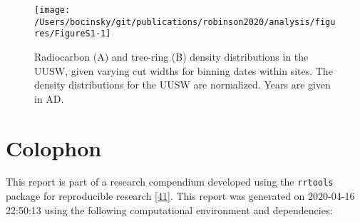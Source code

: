 \documentclass[
]{sa}
\begin{document}
\begin{figure}

{\centering \texttt{[image: /Users/bocinsky/git/publications/robinson2020/analysis/figures/FigureS1-1]} 

}

\caption{Radiocarbon (A) and tree-ring (B) density distributions in the UUSW, given varying cut widths for binning dates within sites. The density distributions for the UUSW are normalized. Years are given in AD.}\label{fig:FigureS1}
\end{figure}

\newpage

\hypertarget{colophon}{%
\section*{Colophon}\label{colophon}}

This report is part of a research compendium developed using the \texttt{rrtools} package for reproducible research {[}\protect\hyperlink{ref-Marwick2017}{41}{]}. This report was generated on 2020-04-16 22:50:13 using the following computational environment and dependencies:
\end{document}
